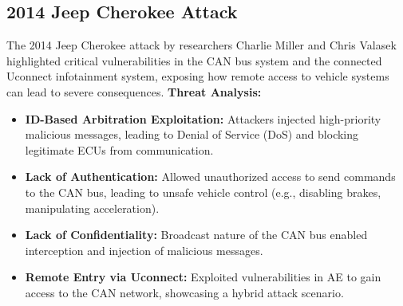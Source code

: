 \documentclass{report}
\begin{document}
\subsection{2014 Jeep Cherokee Attack}
The 2014 Jeep Cherokee attack by researchers Charlie Miller and Chris Valasek highlighted critical vulnerabilities in the CAN bus system and the connected Uconnect infotainment system, exposing how remote access to vehicle systems can lead to severe consequences.
\textbf{Threat Analysis:}\\
\begin{itemize}
    \item \textbf{ID-Based Arbitration Exploitation:} Attackers injected high-priority malicious messages, leading to Denial of Service (DoS) and blocking legitimate ECUs from communication.
    \item \textbf{Lack of Authentication:} Allowed unauthorized access to send commands to the CAN bus, leading to unsafe vehicle control (e.g., disabling brakes, manipulating acceleration).
    \item \textbf{Lack of Confidentiality:} Broadcast nature of the CAN bus enabled interception and injection of malicious messages.
    \item \textbf{Remote Entry via Uconnect:} Exploited vulnerabilities in AE to gain access to the CAN network, showcasing a hybrid attack scenario.
\end{itemize}
\end{document}
